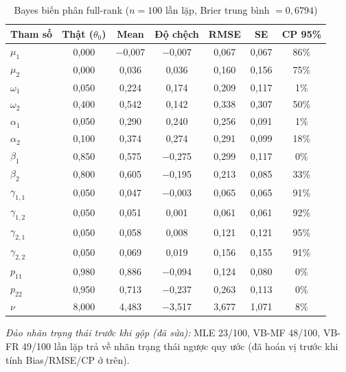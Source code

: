 \documentclass[11pt,a4paper]{article}
\begin{document}
\begin{table}[H]\centering\scriptsize
\caption{Bayes biến phân full-rank ($n=100$ lần lặp, Brier trung bình $=0,6794$)}
\begin{tabularx}{\textwidth}{l C C C C C C}
\toprule
\textbf{Tham số} & \textbf{Thật ($\theta_0$)} & \textbf{Mean} & \textbf{Độ chệch} & \textbf{RMSE} & \textbf{SE} & \textbf{CP 95\%} \\
\midrule
$\mu_1$ & 0,000 & $-$0,007 & $-$0,007 & 0,067 & 0,067 & 86\% \\
$\mu_2$ & 0,000 & 0,036 & 0,036 & 0,160 & 0,156 & 75\% \\
$\omega_1$ & 0,050 & 0,224 & 0,174 & 0,209 & 0,117 & 1\% \\
$\omega_2$ & 0,400 & 0,542 & 0,142 & 0,338 & 0,307 & 50\% \\
$\alpha_1$ & 0,050 & 0,290 & 0,240 & 0,256 & 0,091 & 1\% \\
$\alpha_2$ & 0,100 & 0,374 & 0,274 & 0,291 & 0,099 & 18\% \\
$\beta_1$ & 0,850 & 0,575 & $-$0,275 & 0,299 & 0,117 & 0\% \\
$\beta_2$ & 0,800 & 0,605 & $-$0,195 & 0,213 & 0,085 & 33\% \\
$\gamma_{1,1}$ & 0,050 & 0,047 & $-$0,003 & 0,065 & 0,065 & 91\% \\
$\gamma_{1,2}$ & 0,050 & 0,051 & 0,001 & 0,061 & 0,061 & 92\% \\
$\gamma_{2,1}$ & 0,050 & 0,058 & 0,008 & 0,121 & 0,121 & 95\% \\
$\gamma_{2,2}$ & 0,050 & 0,069 & 0,019 & 0,156 & 0,155 & 91\% \\
$p_{11}$ & 0,980 & 0,886 & $-$0,094 & 0,124 & 0,080 & 0\% \\
$p_{22}$ & 0,950 & 0,713 & $-$0,237 & 0,263 & 0,113 & 0\% \\
$\nu$ & 8,000 & 4,483 & $-$3,517 & 3,677 & 1,071 & 8\% \\
\bottomrule
\end{tabularx}
\end{table}

\emph{Đảo nhãn trạng thái trước khi gộp (đã sửa):} MLE 23/100, VB-MF 48/100, VB-FR 49/100 lần lặp trả về nhãn trạng thái ngược quy ước (đã hoán vị trước khi tính Bias/RMSE/CP ở trên).
\bigskip
\end{document}
